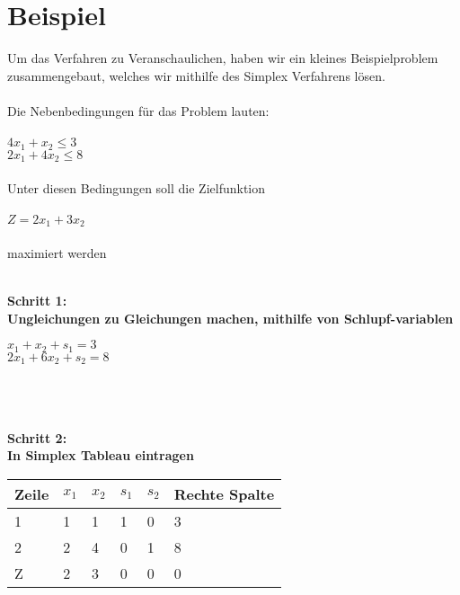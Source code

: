 \section{Beispiel}
Um das Verfahren zu Veranschaulichen, haben wir ein kleines Beispielproblem zusammengebaut, welches wir mithilfe des Simplex Verfahrens lösen.\\~\\
Die Nebenbedingungen für das Problem lauten:\\~\\
\(4x_1+x_2\le3\)\\
\(2x_1+4x_2\le8\)\\~\\
Unter diesen Bedingungen soll die Zielfunktion\\~\\
\(Z = 2x_1+ 3x_2\)\\~\\
maximiert werden\\
\\
\begin{center}
    
\textbf{Schritt 1: \\Ungleichungen zu Gleichungen machen, mithilfe von Schlupf-variablen }\end{center}

\(x_1+x_2+s_1=3\)\\
\(2x_1+6x_2+s_2=8\)\\~\\~\\~\\
\begin{center}
\textbf{Schritt 2:\\In Simplex Tableau eintragen}\\\end{center}
\begin{table}[h]
\begin{tabular}{|l|l|l|l|l|l|}
\hline
\rowcolor[HTML]{C0C0C0} 
Zeile                     & $x_1$ & $x_2$ & $s_1$ & $s_2$ & Rechte Spalte \\ \hline
\cellcolor[HTML]{C0C0C0}1 & 1  & 1  & 1  & 0  & 3             \\ \hline
\cellcolor[HTML]{C0C0C0}2 & 2  & 4  & 0  & 1  & 8             \\ \hline
\cellcolor[HTML]{C0C0C0}Z & 2  & 3  & 0  & 0  & 0             \\ \hline
\end{tabular}
\end{table}

